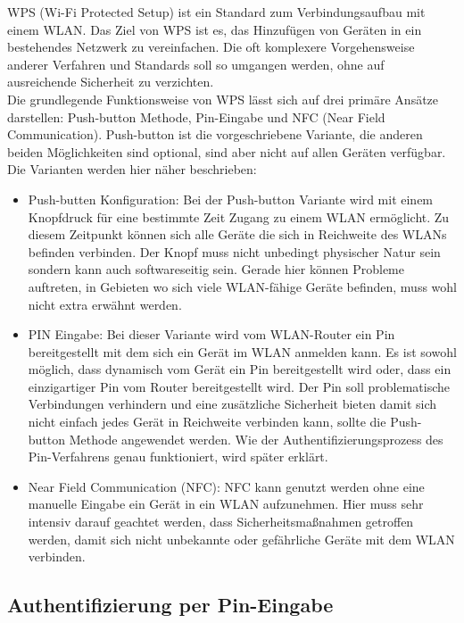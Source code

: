 WPS (Wi-Fi Protected Setup) ist ein Standard zum Verbindungsaufbau mit einem WLAN. Das Ziel von WPS ist es, das Hinzufügen von Geräten in ein bestehendes Netzwerk zu vereinfachen. Die oft komplexere Vorgehensweise anderer Verfahren und Standards soll so umgangen werden, ohne auf ausreichende Sicherheit zu verzichten. \\
Die grundlegende Funktionsweise von WPS lässt sich auf drei primäre Ansätze darstellen: Push-button Methode, Pin-Eingabe und NFC (Near Field Communication). Push-button ist die vorgeschriebene Variante, die anderen beiden Möglichkeiten sind optional, sind aber nicht auf allen Geräten verfügbar. \\
Die Varianten werden hier näher beschrieben:

\begin{itemize}
	\item Push-butten Konfiguration: Bei der Push-button Variante wird mit einem Knopfdruck für eine bestimmte Zeit Zugang zu einem WLAN ermöglicht. Zu diesem Zeitpunkt können sich alle Geräte die sich in Reichweite des WLANs befinden verbinden. Der Knopf muss nicht unbedingt physischer Natur sein sondern kann auch softwareseitig sein. Gerade hier können Probleme auftreten, in Gebieten wo sich viele WLAN-fähige Geräte befinden, muss wohl nicht extra erwähnt werden.

	\item PIN Eingabe: Bei dieser Variante wird vom WLAN-Router ein Pin bereitgestellt mit dem sich ein Gerät im WLAN anmelden kann. Es ist sowohl möglich, dass dynamisch vom Gerät ein Pin bereitgestellt wird oder, dass ein einzigartiger Pin vom Router bereitgestellt wird. Der Pin soll problematische Verbindungen verhindern und eine zusätzliche Sicherheit bieten damit sich nicht einfach jedes Gerät in Reichweite verbinden kann, sollte die Push-button Methode angewendet werden. Wie der Authentifizierungsprozess des Pin-Verfahrens genau funktioniert, wird später erklärt.

	\item Near Field Communication (NFC): NFC kann genutzt werden ohne eine manuelle Eingabe ein Gerät in ein WLAN aufzunehmen. Hier muss sehr intensiv darauf geachtet werden, dass Sicherheitsmaßnahmen getroffen werden, damit sich nicht unbekannte oder gefährliche Geräte mit dem WLAN verbinden.
\end{itemize}

\subsection{Authentifizierung per Pin-Eingabe}

